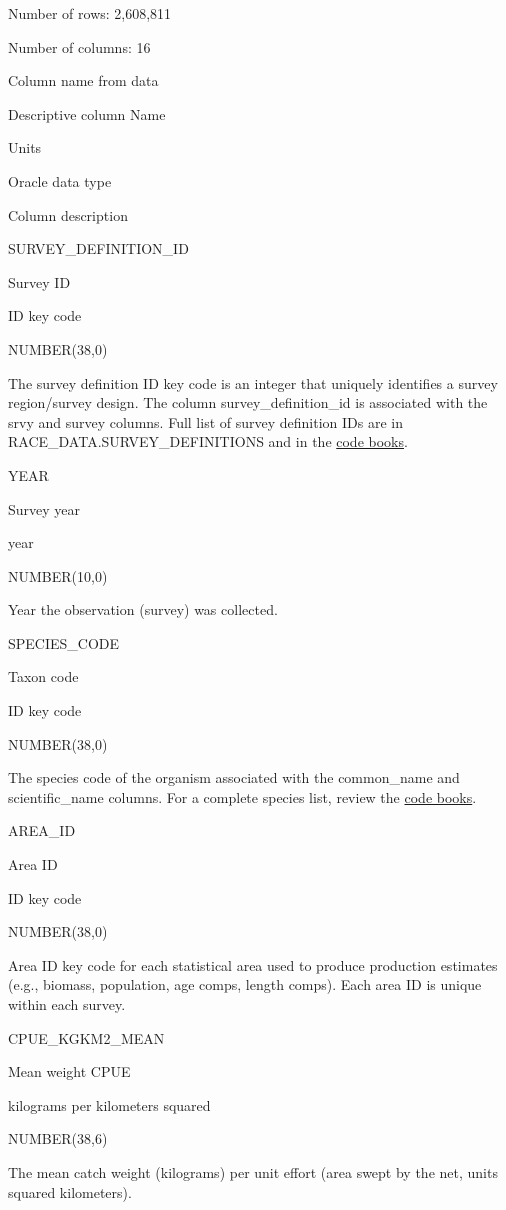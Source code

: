 \documentclass[
  letterpaper,
  oneside,
  open=any]{scrbook}
\begin{document}
Number of rows: 2,608,811

Number of columns: 16

Column name from data

Descriptive column Name

Units

Oracle data type

Column description

SURVEY\_DEFINITION\_ID

Survey ID

ID key code

NUMBER(38,0)

The survey definition ID key code is an integer that uniquely identifies
a survey region/survey design. The column survey\_definition\_id is
associated with the srvy and survey columns. Full list of survey
definition IDs are in RACE\_DATA.SURVEY\_DEFINITIONS and in the
\href{https://www.fisheries.noaa.gov/resource/document/groundfish-survey-species-code-manual-and-data-codes-manual}{code
books}.

YEAR

Survey year

year

NUMBER(10,0)

Year the observation (survey) was collected.

SPECIES\_CODE

Taxon code

ID key code

NUMBER(38,0)

The species code of the organism associated with the common\_name and
scientific\_name columns. For a complete species list, review the
\href{https://www.fisheries.noaa.gov/resource/document/groundfish-survey-species-code-manual-and-data-codes-manual}{code
books}.

AREA\_ID

Area ID

ID key code

NUMBER(38,0)

Area ID key code for each statistical area used to produce production
estimates (e.g., biomass, population, age comps, length comps). Each
area ID is unique within each survey.

CPUE\_KGKM2\_MEAN

Mean weight CPUE

kilograms per kilometers squared

NUMBER(38,6)

The mean catch weight (kilograms) per unit effort (area swept by the
net, units squared kilometers).
\end{document}
